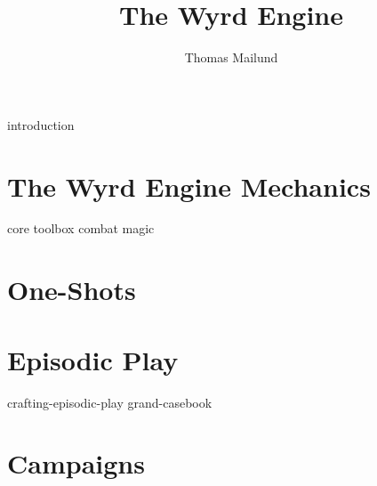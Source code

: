 \documentclass[twocolumn,nodeprecatedcode,bg=print]{dndbook/dndbook}
\title{The Wyrd Engine}
\author{Thomas Mailund}
\begin{document}
\DndSetThemeColor[DmgSlateGray]

\frontmatter
\maketitle
\tableofcontents

\mainmatter%


{introduction}

\part{The Wyrd Engine Mechanics}
{core}
{toolbox}
{combat}
{magic}

\part{One-Shots}
% 

\part{Episodic Play}
{crafting-episodic-play}
{grand-casebook}

\part{Campaigns}


\printindex
\end{document}
